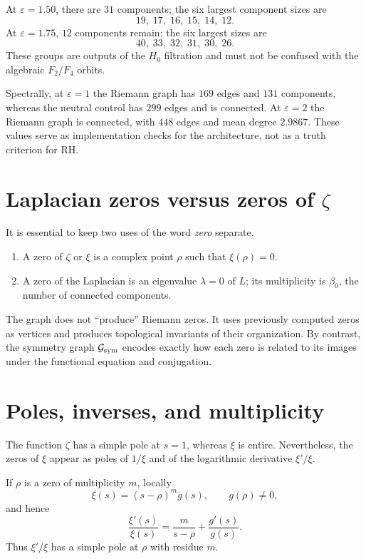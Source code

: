 \documentclass[11pt]{amsart}
\theoremstyle{definition}
\theoremstyle{remark}
\begin{document}
At $\varepsilon=1.50$, there are $31$ components; the six largest component sizes are
\[
19,\;17,\;16,\;15,\;14,\;12.
\]
At $\varepsilon=1.75$, $12$ components remain; the six largest sizes are
\[
40,\;33,\;32,\;31,\;30,\;26.
\]
These groups are outputs of the $H_0$ filtration and must not be confused with the algebraic $F_2/F_4$ orbits.

Spectrally, at $\varepsilon=1$ the Riemann graph has $169$ edges and $131$ components, whereas the neutral control has $299$ edges and is connected. At $\varepsilon=2$ the Riemann graph is connected, with $448$ edges and mean degree $2.9867$. These values serve as implementation checks for the architecture, not as a truth criterion for RH.

\section{Laplacian zeros versus zeros of $\zeta$}
It is essential to keep two uses of the word \emph{zero} separate.

\begin{enumerate}[label=(\alph*)]
\item A zero of $\zeta$ or $\xi$ is a complex point $\rho$ such that $\xi(\rho)=0$.
\item A zero of the Laplacian is an eigenvalue $\lambda=0$ of $L$; its multiplicity is $\beta_0$, the number of connected components.
\end{enumerate}

The graph does not ``produce'' Riemann zeros. It uses previously computed zeros as vertices and produces topological invariants of their organization. By contrast, the symmetry graph $\mathcal G_{\rm sym}$ encodes exactly how each zero is related to its images under the functional equation and conjugation.

\section{Poles, inverses, and multiplicity}
The function $\zeta$ has a simple pole at $s=1$, whereas $\xi$ is entire. Nevertheless, the zeros of $\xi$ appear as poles of $1/\xi$ and of the logarithmic derivative $\xi'/\xi$.

If $\rho$ is a zero of multiplicity $m$, locally
\begin{equation}
 \xi(s)=(s-\rho)^m g(s),\qquad g(\rho)\neq0,
\end{equation}
and hence
\begin{equation}\label{eq:logder}
 \frac{\xi'(s)}{\xi(s)}=\frac{m}{s-\rho}+\frac{g'(s)}{g(s)}.
\end{equation}
Thus $\xi'/\xi$ has a simple pole at $\rho$ with residue $m$.
\end{document}
